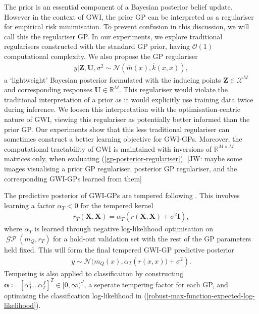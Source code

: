 \documentclass{article}
\newcommand{\jw}[1]{{\color{gray} [JW: #1]}}
\newcommand{\GP}{\operatorname{\mathcal{GP}}}
\numberwithin{equation}{section}
\begin{document}
The prior is an essential component of a Bayesian posterior belief update.
However in the context of GWI, the prior GP can be interpreted as a regulariser for empirical risk minimisation.
To prevent confusion in this discussion, we will call this the regulariser GP. In our experiments, we explore traditional regularisers constructed with the standard GP prior, having $\mathcal{O}(1)$ computational complexity. We also propose the GP regulariser
\begin{align}
    y \vert \mathbf{Z}, \mathbf{U}, \sigma^2
    \sim \mathcal{N}\left(\bar{m}(x), \bar{k}(x, x)\right),
    \label{gp-posterior-regulariser}
\end{align}
a `lightweight' Bayesian posterior formulated with the inducing points $\mathbf{Z}\in \mathcal{X}^M$ and corresponding responses $\mathbf{U} \in \mathbb{R}^M$.
This regulariser would violate the traditional interpretation of a prior as it would explicitly use training data twice during inference.
We loosen this interpretation with the optimisation-centric nature of GWI, viewing this regulariser as potentially better informed than the prior GP.
Our experiments show that this less traditional regulariser can sometimes construct a better learning objective for GWI-GPs.
Moreover, the computational tractability of GWI is maintained with inversions of $\mathbb{R}^{M\times M}$ matrices only, when evaluating (\ref{gp-posterior-regulariser}).
\jw{maybe some images visualising a prior GP regulariser, posterior GP regulariser, and the corresponding GWI-GPs learned from them}

The predictive posterior of GWI-GPs are tempered following \cite{wild2022generalized}. This involves learning a factor $\alpha_T < 0$ for the tempered kernel
\begin{align}
    r_T(\mathbf{X}, \mathbf{X}) = \alpha_T \left(r(\mathbf{X}, \mathbf{X})+\sigma^2 \mathbf{I}\right),
\end{align}
where $\alpha_T$ is learned through negative log-likelihood optimisation on $\GP(m_Q, r_T)$ for a hold-out validation set with the rest of the GP parameters held fixed. This will form the final tempered GWI-GP predictive posterior
\begin{align}
    y \sim \mathcal{N}(m_Q(x), \alpha_T \left( r(x, x)) + \sigma^2\right).
\end{align}
Tempering is also applied to classificaiton by constructing $\boldsymbol{\alpha} \coloneqq \left[\alpha_T^1 \dots \alpha_T^J\right]^T \in [0, \infty)^J$, a seperate tempering factor for each GP, and optimising the classification log-likelihood in (\ref{robust-max-function-expected-log-likelihood}).
\end{document}
